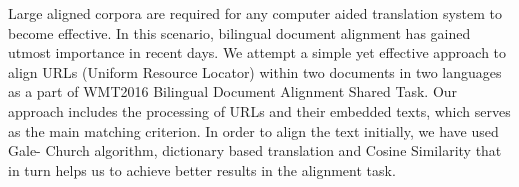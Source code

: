 Large aligned corpora are required for any computer aided translation system to become effective. In this scenario, bilingual document alignment has gained utmost importance in recent days. We attempt a simple yet effective approach to align URLs (Uniform Resource Locator) within two documents in two languages as a part of WMT2016 Bilingual Document Alignment Shared Task. Our approach includes the processing of URLs and their embedded texts, which serves as the main matching criterion. In order to align the text initially, we have used Gale- Church algorithm, dictionary based translation and Cosine Similarity that in turn helps us to achieve better results in the alignment task.
